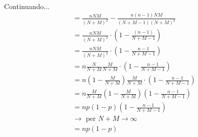 \documentclass[11pt]{report}
\begin{document}
\begin{itemize}
\begin{equation}
\begin{split}
        \end{split}
    \end{equation}
    Continuando...
    \begin{equation}
    	\begin{split}
            & = \frac{nNM}{(N+M)^2} - \frac{n(n-1)NM}{(N+M-1)(N+M)^2}\\
            & = \frac{nNM}{(N+M)^2} \cdot \left( 1 - \frac{(n-1)}{N+M-1} \right)\\
            & = \frac{nNM}{(N+M)^2} \cdot \left( 1 - \frac{n-1}{N+M-1} \right)\\
            & = n \frac{N}{N+M} \frac{M}{N+M} \cdot \left( 1 - \frac{n-1}{N+M-1} \right)\\
            & = n \left( 1 - \frac{M}{N+M} \right) \frac{M}{N+M} \cdot \left( 1 - \frac{n-1}{N+M-1} \right)\\
            & = n \frac{M}{N+M} \left( 1 - \frac{M}{N+M} \right) \left( 1 - \frac{n-1}{N+M-1} \right)\\
            & = np(1-p) \left( 1 - \frac{n-1}{N+M-1} \right)\\
            & \rightarrow \text{ per } N+M \rightarrow \infty\\
            & = np(1-p)
		\end{split}
    \end{equation}
\end{itemize}
\begin{center}
    
\end{center}
\begin{center}
    
\end{center}
\end{document}

